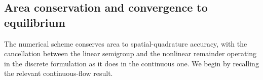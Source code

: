 \documentclass{amsart}
\begin{document}



\subsection{Area conservation and convergence to equilibrium}
\label{ss:area_conservation}

The numerical scheme conserves area to spatial-quadrature accuracy, with the cancellation between the linear semigroup and the nonlinear remainder operating in the discrete formulation as it does in the continuous one.  We begin by recalling the relevant continuous-flow result.
\end{document}
